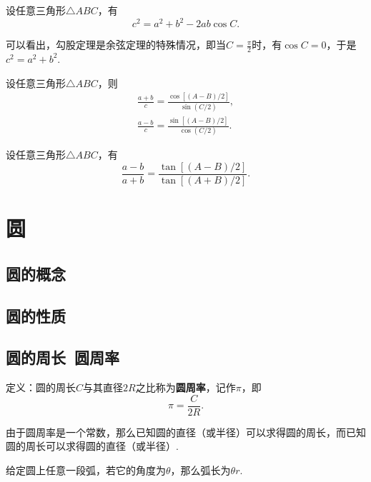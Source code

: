 \begin{theorem}[余弦定理]
设任意三角形\(\triangle ABC\)，有\begin{equation}
c^2 = a^2 + b^2 - 2ab \cos C.
\end{equation}
\end{theorem}
可以看出，勾股定理是余弦定理的特殊情况，即当\(C = \frac{\pi}{2}\)时，有\(\cos C=0\)，于是\(c^2 = a^2 + b^2\).

\begin{theorem}[摩尔外德公式]
设任意三角形\(\triangle ABC\)，则\begin{gather}
\frac{a+b}{c}
= \frac{\cos[(A-B)/2]}{\sin(C/2)}, \\
\frac{a-b}{c}
= \frac{\sin[(A-B)/2]}{\cos(C/2)}.
\end{gather}
\end{theorem}

\begin{theorem}[正切定理]
设任意三角形\(\triangle ABC\)，有\begin{equation}
\frac{a-b}{a+b} = \frac{\tan[(A-B)/2]}{\tan[(A+B)/2]}.
\end{equation}
\end{theorem}

\section{圆}
\subsection{圆的概念}
\subsection{圆的性质}
\subsection{圆的周长\ 圆周率}
\begin{definition}
定义：圆的周长\(C\)与其直径\(2R\)之比称为\textbf{圆周率}，记作\(\pi\)，即\[
\pi = \frac{C}{2R}.
\]
\end{definition}
由于圆周率是一个常数，那么已知圆的直径（或半径）可以求得圆的周长，而已知圆的周长可以求得圆的直径（或半径）.

\begin{property}
给定圆上任意一段弧，若它的角度为\(\theta\)，那么弧长为\(\theta r\).
\end{property}

